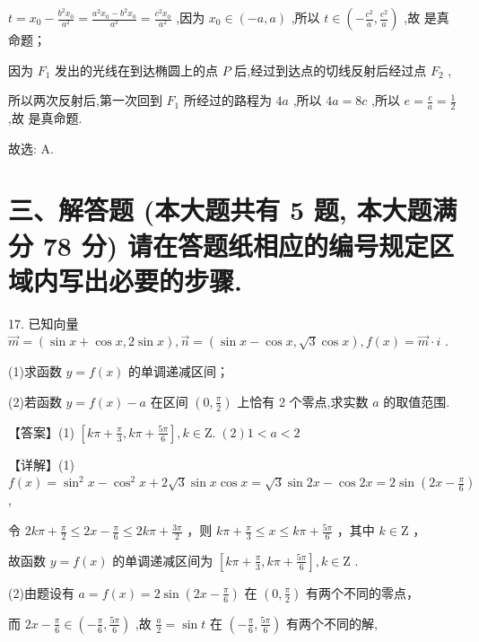 \documentclass[10pt]{article}
\newcommand*\circled[1]{\tikz[baseline=(char.base)]{\node[shape=circle,draw,inner sep=1.5pt] (char) {\small #1};}}
\begin{document}
\(t = {x}_{0} - \frac{{b}^{2}{x}_{0}}{{a}^{2}} = \frac{{a}^{2}{x}_{0} - {b}^{2}{x}_{0}}{{a}^{2}} = \frac{{c}^{2}{x}_{0}}{{a}^{2}}\) ,因为 \({x}_{0} \in  \left( {-a,a}\right)\) ,所以 \(t \in  \left( {-\frac{{c}^{2}}{a},\frac{{c}^{2}}{a}}\right)\) ,故 \circled{1} 是真命题；

因为 \({F}_{1}\) 发出的光线在到达椭圆上的点 \(P\) 后,经过到达点的切线反射后经过点 \({F}_{2}\) ,

所以两次反射后,第一次回到 \({F}_{1}\) 所经过的路程为 \({4a}\) ,所以 \({4a} = {8c}\) ,所以 \(e = \frac{c}{a} = \frac{1}{2}\) ,故 \circled{2} 是真命题.

故选: A.

\section*{三、解答题 (本大题共有 5 题, 本大题满分 78 分) 请在答题纸相应的编号规定区域内写出必要的步骤.}

17. 已知向量 \(\overrightarrow{m} = \left( {\sin x + \cos x,2\sin x}\right) ,\overrightarrow{n} = \left( {\sin x - \cos x,\sqrt{3}\cos x}\right) ,f\left( x\right)  = \overrightarrow{m} \cdot  i\) .

(1)求函数 \(y = f\left( x\right)\) 的单调递减区间；

(2)若函数 \(y = f\left( x\right)  - a\) 在区间 \(\left( {0,\frac{\pi }{2}}\right)\) 上恰有 2 个零点,求实数 \(a\) 的取值范围.

【答案】(1) \(\left\lbrack  {{k\pi } + \frac{\pi }{3},{k\pi } + \frac{5\pi }{6}}\right\rbrack  ,k \in  \mathrm{Z}.\;\left( 2\right) 1 < a < 2\)

【详解】(1) \(f\left( x\right)  = {\sin }^{2}x - {\cos }^{2}x + 2\sqrt{3}\sin x\cos x = \sqrt{3}\sin {2x} - \cos {2x} = 2\sin \left( {{2x} - \frac{\pi }{6}}\right)\) ,

令 \({2k\pi } + \frac{\pi }{2} \leq  {2x} - \frac{\pi }{6} \leq  {2k\pi } + \frac{3\pi }{2}\) ，则 \({k\pi } + \frac{\pi }{3} \leq  x \leq  {k\pi } + \frac{5\pi }{6}\) ，其中 \(k \in  \mathrm{Z}\) ，

故函数 \(y = f\left( x\right)\) 的单调递减区间为 \(\left\lbrack  {{k\pi } + \frac{\pi }{3},{k\pi } + \frac{5\pi }{6}}\right\rbrack  ,k \in  \mathrm{Z}\) .

(2)由题设有 \(a = f\left( x\right)  = 2\sin \left( {{2x} - \frac{\pi }{6}}\right)\) 在 \(\left( {0,\frac{\pi }{2}}\right)\) 有两个不同的零点，

而 \({2x} - \frac{\pi }{6} \in  \left( {-\frac{\pi }{6},\frac{5\pi }{6}}\right)\) ,故 \(\frac{a}{2} = \sin t\) 在 \(\left( {-\frac{\pi }{6},\frac{5\pi }{6}}\right)\) 有两个不同的解,
\end{document}
